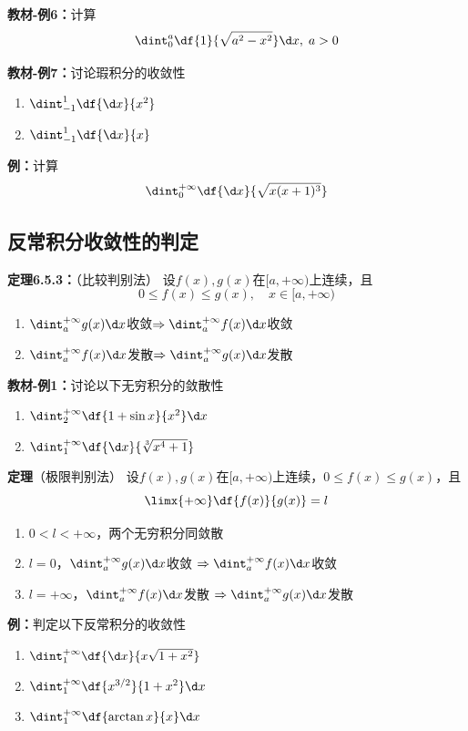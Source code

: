 {\bf 教材-例6：}计算
$$\dint_0^a\df{1}{\sqrt{a^2-x^2}}\d x,\;a>0$$

{\bf 教材-例7：}讨论瑕积分的收敛性
\begin{enumerate}[(1)]
  \setlength{\itemindent}{1cm}
  \item $\dint_{-1}^1\df{\d x}{x^2}$ 
  \item $\dint_{-1}^1\df{\d x}{x}$
\end{enumerate}

{\bf 例：}计算
$$\dint_0^{+\infty}\df{\d x}{\sqrt{x(x+1)^3}}$$

\subsection{反常积分收敛性的判定}

{\bf 定理6.5.3：}（比较判别法）
设$f(x),g(x)$在$[a,+\infty)$上连续，且
$$0\leq f(x)\leq g(x),\quad x\in[a,+\infty)$$ 
\begin{enumerate}[(1)]
  \setlength{\itemindent}{1cm}
  \item
  $\dint_a^{+\infty}g(x)\d x$收敛$\Rightarrow\dint_a^{+\infty}f(x)\d x$收敛 
  \item $\dint_a^{+\infty}f(x)\d x$发散$\Rightarrow\dint_a^{+\infty}g(x)\d x$发散
\end{enumerate}

{\bf 教材-例1：}讨论以下无穷积分的敛散性
\begin{enumerate}[(1)]
  \setlength{\itemindent}{1cm}
  \item $\dint_2^{+\infty}\df{1+\sin x}{x^2}\d x$ 
  \item $\dint_1^{+\infty}\df{\d x}{\sqrt[3]{x^4+1}}$
\end{enumerate}

{\bf 定理}（极限判别法）
设$f(x),g(x)$在$[a,+\infty)$上连续，$0\leq f(x)\leq g(x)$，且
$$\limx{+\infty}\df{f(x)}{g(x)}=l$$ 
\begin{enumerate}[(1)]
  \setlength{\itemindent}{1cm}
  \item $0<l<+\infty$，两个无穷积分同敛散 
  \item
  $l=0$，$\dint_a^{+\infty}g(x)\d x$收敛
  $\Rightarrow\dint_a^{+\infty}f(x)\d x$收敛 
  \item
  $l=+\infty$，$\dint_a^{+\infty}f(x)\d x$发散
  $\Rightarrow\dint_a^{+\infty}g(x)\d x$发散
\end{enumerate}

{\bf 例：}判定以下反常积分的收敛性
\begin{enumerate}[(1)]
  \setlength{\itemindent}{1cm}
  \item $\dint_1^{+\infty}\df{\d x}{x\sqrt{1+x^2}}$ 
  \item $\dint_1^{+\infty}\df{x^{3/2}}{1+x^2}\d x$ 
  \item $\dint_1^{+\infty}\df{\arctan x}{x}\d x$
\end{enumerate}


